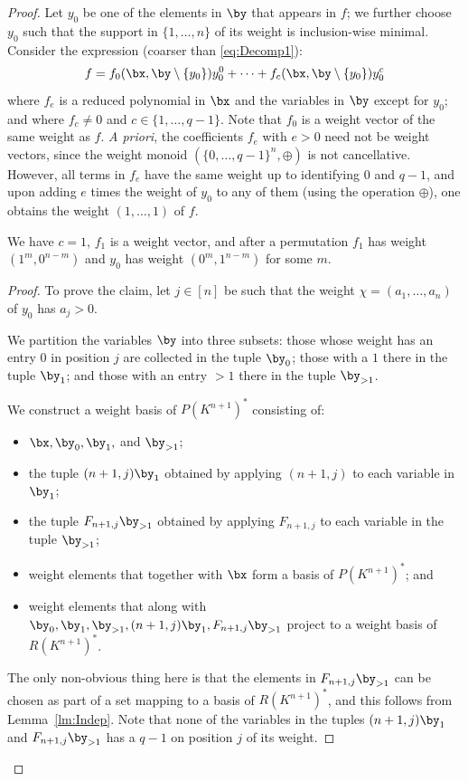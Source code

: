 \documentclass{amsart}
\newcommand{\ab}{c} %
\begin{document}
\begin{proof}
Let $y_0$ be one of the elements in $\by$ that appears in $f$; we further
choose $y_0$ such that the support in $\{1,\ldots,n\}$ of
its weight is inclusion-wise minimal. Consider the expression (coarser than
\eqref{eq:Decomp1}):
\[ f=f_0(\bx,\by\setminus \{y_0\}) y_0^0 + \dots +
f_{\ab}(\bx,\by \setminus \{y_0\}) y_0^{\ab} \]
where $f_e$ is a reduced polynomial in $\bx$ and the variables in $\by$ except
for $y_0$; and where $f_{\ab} \neq 0$ and ${\ab} \in \{1,\ldots,q-1\}$. Note
that $f_0$ is a weight vector of the same weight as $f$. {\em A priori},
the coefficients $f_e$ with $e>0$ need not be weight vectors, since the
weight monoid $(\{0,\ldots,q-1\}^n,\oplus)$ is not cancellative. However,
all terms in $f_e$ have the same weight up to identifying $0$ and
$q-1$, and upon adding $e$ times the weight of $y_0$
to any of them (using the operation $\oplus$), one obtains
the weight $(1,\ldots,1)$ of $f$.

\begin{lm}
We have ${\ab}=1$, $f_1$ is a weight vector, and after a permutation
$f_1$ has weight $(1^m,0^{n-m})$ and $y_0$ has weight
$(0^{m},1^{n-m})$ for some $m$.
\end{lm}

\begin{proof}
To prove the claim, let $j \in [n]$ be such that the weight
$\chi=(a_1,\ldots,a_n)$ of $y_0$ has $a_j>0$.

We partition the variables $\by$ into three subsets: those whose weight
has an entry $0$ in position $j$ are collected in the tuple $\by_0$;
those with a $1$ there in the tuple $\by_1$; and those with an entry $>1$
there in the tuple $\by_{>1}$.

We construct a weight basis of $P(K^{n+1})^*$ consisting of:
\begin{itemize}
\item $\bx,\by_0,\by_1,$ and $\by_{>1}$; 
\item the tuple $(n+1,j)\by_1$ obtained by applying
$(n+1,j)$ to each variable in $\by_1$; 
\item the tuple $F_{n+1,j}\by_{>1}$
obtained by applying $F_{n+1,j}$ to each variable in the
tuple $\by_{>1}$;
\item weight elements that together with $\bx$ form
a basis of $P(K^{n+1})^*$; and
\item weight elements that along with
$\by_0,\by_1,\by_{>1},(n+1,j)\by_1,F_{n+1,j}\by_{>1}$ project to a weight
basis of $R(K^{n+1})^*$.
\end{itemize}
The only non-obvious thing here is that the elements in
$F_{n+1,j}\by_{>1}$ can be chosen as part of a set mapping
to a basis of $R(K^{n+1})^*$, and this
follows from Lemma~\ref{lm:Indep}. Note that none of the variables
in the tuples $(n+1,j)\by_1$ and $F_{n+1,j}\by_{>1}$ has a $q-1$ on position $j$ of
its weight.


\end{proof}
\end{proof}
\end{document}
